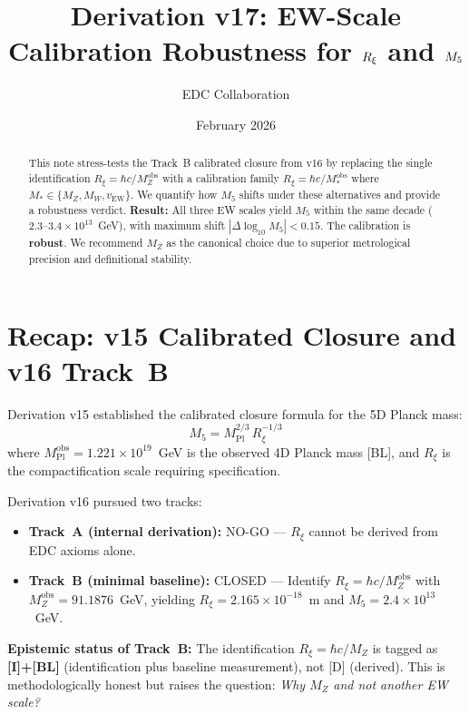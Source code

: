 \documentclass[11pt,a4paper]{article}
\title{Derivation v17: EW-Scale Calibration Robustness for $\Rxi$ and $\Mfive$}
\author{EDC Collaboration}
\date{February 2026}
\newcommand{\Rxi}{R_\xi}
\newcommand{\Mpl}{M_{\mathrm{Pl}}}
\newcommand{\Mfive}{M_5}
\newcommand{\MZ}{M_Z}
\newcommand{\MW}{M_W}
\newcommand{\vEW}{v_{\mathrm{EW}}}
\begin{document}
\maketitle

\begin{abstract}
This note stress-tests the Track~B calibrated closure from v16 by replacing the single
identification $\Rxi = \hbar c / \MZ^{\mathrm{obs}}$ with a calibration family
$\Rxi = \hbar c / M_*^{\mathrm{obs}}$ where $M_* \in \{\MZ, \MW, \vEW\}$.
We quantify how $\Mfive$ shifts under these alternatives and provide a robustness verdict.
\textbf{Result:} All three EW scales yield $\Mfive$ within the same decade
($2.3$--$3.4 \times 10^{13}$~GeV), with maximum shift $|\Delta\log_{10}\Mfive| < 0.15$.
The calibration is \textbf{robust}. We recommend $\MZ$ as the canonical choice due to
superior metrological precision and definitional stability.
\end{abstract}

\section{Recap: v15 Calibrated Closure and v16 Track~B}

Derivation v15 established the calibrated closure formula for the 5D Planck mass:
\begin{equation}
\boxed{\Mfive = \Mpl^{2/3} \, \Rxi^{-1/3}}
\label{eq:M5-closure}
\end{equation}
where $\Mpl^{\mathrm{obs}} = 1.221 \times 10^{19}$~GeV is the observed 4D Planck mass [BL],
and $\Rxi$ is the compactification scale requiring specification.

Derivation v16 pursued two tracks:
\begin{itemize}
\item \textbf{Track~A (internal derivation):} NO-GO --- $\Rxi$ cannot be derived from EDC axioms alone.
\item \textbf{Track~B (minimal baseline):} CLOSED --- Identify $\Rxi = \hbar c / \MZ^{\mathrm{obs}}$
with $\MZ^{\mathrm{obs}} = 91.1876$~GeV, yielding $\Rxi = 2.165 \times 10^{-18}$~m and
$\Mfive = 2.4 \times 10^{13}$~GeV.
\end{itemize}

\textbf{Epistemic status of Track~B:} The identification $\Rxi = \hbar c / \MZ$ is tagged as
\textbf{[I]+[BL]} (identification plus baseline measurement), not [D] (derived). This is
methodologically honest but raises the question: \emph{Why $\MZ$ and not another EW scale?}
\end{document}
